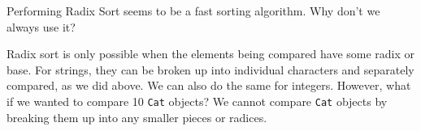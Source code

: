 \begin{blocksection}
\question Performing Radix Sort seems to be a fast sorting algorithm. Why don't we always use it?

\begin{solution}
Radix sort is only possible when the elements being compared have some radix or base. For strings, 
they can be broken up into individual characters and separately compared, as we did above. We can
also do the same for integers. However, what if we wanted to compare 10 \lstinline$Cat$ objects? 
We cannot compare \lstinline$Cat$ objects by breaking them up into any smaller pieces or radices.
\end{solution}
\end{blocksection}